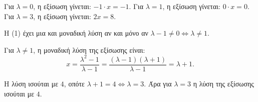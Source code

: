 
\begin{alist}
\item Για $\lambda = 0$, η εξίσωση γίνεται: $-1 \cdot x = -1$.
Για $\lambda = 1$, η εξίσωση γίνεται: $0 \cdot x = 0$.
Για $\lambda = 3$, η εξίσωση γίνεται: $2x = 8$.

\item
\begin{rlist}
\item Η (1) έχει μια και μοναδική λύση αν και μόνο αν $\lambda - 1 \ne 0 \Leftrightarrow \lambda \ne 1$.
\item Για $\lambda \ne 1$, η μοναδική λύση της εξίσωσης είναι:
\[x = \dfrac{\lambda^2 - 1}{\lambda - 1} = \dfrac{(\lambda - 1)(\lambda + 1)}{\lambda - 1} = \lambda + 1.\]

Η λύση ισούται με $4$, οπότε $\lambda + 1 = 4 \Leftrightarrow \lambda = 3$.
Άρα για $\lambda = 3$ η λύση της εξίσωσης ισούται με $4$.
\end{rlist}
\end{alist}

